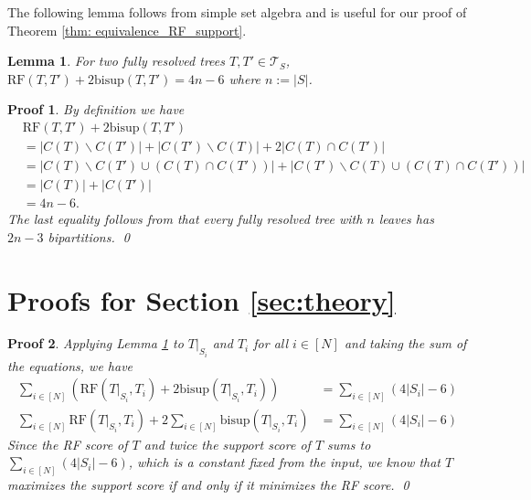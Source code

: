 \documentclass{bmcart}
\newcommand{\bs}{\mathrm{bisup}}
\newcommand{\RF}{\mathrm{RF}}
\theoremstyle{mystyle}
\newtheorem{lemma}{Lemma}
\theoremstyle{proofstyle}
\newtheorem*{proof2}{Proof}
\newenvironment{proofnospace}{\begin{proof2}}{\qed \end{proof2}}
\begin{document}
The following lemma follows from simple set algebra and is useful for our proof of Theorem \ref{thm: equivalence_RF_support}.
\begin{lemma}\label{lem:sum_RF_support}
For two fully resolved trees $T,T' \in \mathcal{T}_S$, $\RF(T,T')+2\bs(T,T') = 4n - 6$ where $n := |S|$.
\end{lemma}
\begin{proofnospace}
By definition we have 
  \begin{align*}
    &\RF(T,T')+2\bs(T,T') \\ &= |C(T)\backslash C(T')| + |C(T') \backslash C(T)| + 2|C(T) \cap C(T')| \\
    &= |C(T)\backslash C(T') \cup (C(T) \cap C(T'))| + |C(T') \backslash C(T) \cup (C(T) \cap C(T'))|\\
    &= |C(T)| + |C(T')|\\
    &= 4n-6.
  \end{align*}
  The last equality follows from that every fully resolved tree with $n$ leaves has $2n-3$ bipartitions.
\end{proofnospace}



\section{Proofs for Section \ref{sec:theory}}

\thmEquivalentProblems*
\begin{proofnospace}
  Applying Lemma \ref{lem:sum_RF_support} to $T|_{S_i}$ and $T_i$ for all $i \in [N]$ and taking the sum of the equations, we have
  \begin{align*}
    \sum_{i \in [N]} (\RF(T|_{S_i}, T_i) + 2\bs(T|_{S_i},T_i)) &= \sum_{i \in [N]} (4|S_i|-6) \\
    \sum_{i \in [N]} \RF(T|_{S_i}, T_i) + 2\sum_{i \in [N]}\bs(T|_{S_i},T_i) &= \sum_{i \in [N]} (4|S_i|-6)
  \end{align*}
  Since the RF score of $T$ and twice the support score of $T$ sums to $\sum_{i \in [N]} (4|S_i|-6)$, which is a constant fixed from the input, we know that $T$ maximizes the support score if and only if it minimizes the RF score.
\end{proofnospace}
\end{document}
